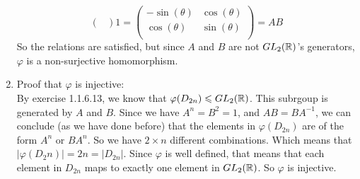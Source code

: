 \documentclass[12pt]{article}
\begin{document}
\begin{enumerate}[label=\textbf{\alph*.}]
\[{\begin{pmatrix}
            \end{pmatrix}}{1} 
            = \begin{pmatrix}
                -\sin(\theta) & \cos(\theta) \\
                \cos(\theta) & \sin(\theta) \\
            \end{pmatrix} = AB \]
            So the relations are satisfied,
            but since $A$ and $B$ are not $GL_2(\mathbb{R})$'s generators,
            $\varphi$ is a non-surjective homomorphism.
        \item
            Proof that $\varphi$ is injective: \\
            By exercise 1.1.6.13,
            we know that $\varphi(D_{2n}) \leqslant GL_2(\mathbb{R})$.
            This subrgoup is generated by $A$ and $B$.
            Since we have $A^n = B^2 = 1$,
            and $AB = BA^{-1}$,
            we can conclude (as we have done before)
            that the elements in $\varphi(D_{2n})$
            are of the form $A^n$ or $BA^n$.
            So we have $2 \times n$ different combinations.
            Which means that $|\varphi(D_2n)| = 2n = |D_{2n}|$.
            Since $\varphi$ is well defined,
            that means that each element in $D_{2n}$ maps to exactly
            one element in $GL_2(\mathbb{R})$.
            So $\varphi$ is injective.
    \end{enumerate}

    
\end{document}
